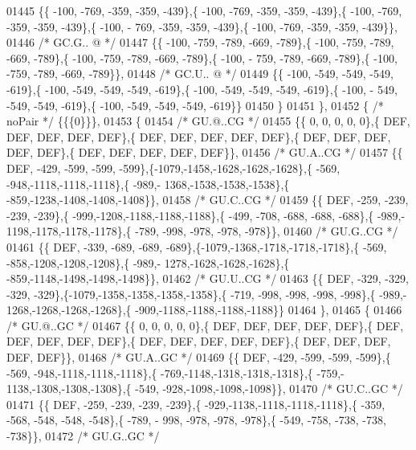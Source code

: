 \begin{DoxyCode}
01445 \{\{ -100, -769, -359, -359, -439\},\{ -100, -769, -359, -359, -439\},\{ -100, -769, -359, -359, -439\},\{ -100, -
      769, -359, -359, -439\},\{ -100, -769, -359, -359, -439\}\},
01446 \textcolor{comment}{/* GC.G.. @ */}
01447 \{\{ -100, -759, -789, -669, -789\},\{ -100, -759, -789, -669, -789\},\{ -100, -759, -789, -669, -789\},\{ -100, -
      759, -789, -669, -789\},\{ -100, -759, -789, -669, -789\}\},
01448 \textcolor{comment}{/* GC.U.. @ */}
01449 \{\{ -100, -549, -549, -549, -619\},\{ -100, -549, -549, -549, -619\},\{ -100, -549, -549, -549, -619\},\{ -100, -
      549, -549, -549, -619\},\{ -100, -549, -549, -549, -619\}\}
01450 \}
01451 \},
01452 \{ \textcolor{comment}{/* noPair */} \{\{\{0\}\}\},
01453 \{
01454 \textcolor{comment}{/* GU.@..CG */}
01455 \{\{    0,    0,    0,    0,    0\},\{  DEF,  DEF,  DEF,  DEF,  DEF\},\{  DEF,  DEF,  DEF,  DEF,  DEF\},\{  DEF,  
      DEF,  DEF,  DEF,  DEF\},\{  DEF,  DEF,  DEF,  DEF,  DEF\}\},
01456 \textcolor{comment}{/* GU.A..CG */}
01457 \{\{  DEF, -429, -599, -599, -599\},\{-1079,-1458,-1628,-1628,-1628\},\{ -569, -948,-1118,-1118,-1118\},\{ -989,-
      1368,-1538,-1538,-1538\},\{ -859,-1238,-1408,-1408,-1408\}\},
01458 \textcolor{comment}{/* GU.C..CG */}
01459 \{\{  DEF, -259, -239, -239, -239\},\{ -999,-1208,-1188,-1188,-1188\},\{ -499, -708, -688, -688, -688\},\{ -989,-
      1198,-1178,-1178,-1178\},\{ -789, -998, -978, -978, -978\}\},
01460 \textcolor{comment}{/* GU.G..CG */}
01461 \{\{  DEF, -339, -689, -689, -689\},\{-1079,-1368,-1718,-1718,-1718\},\{ -569, -858,-1208,-1208,-1208\},\{ -989,-
      1278,-1628,-1628,-1628\},\{ -859,-1148,-1498,-1498,-1498\}\},
01462 \textcolor{comment}{/* GU.U..CG */}
01463 \{\{  DEF, -329, -329, -329, -329\},\{-1079,-1358,-1358,-1358,-1358\},\{ -719, -998, -998, -998, -998\},\{ -989,-
      1268,-1268,-1268,-1268\},\{ -909,-1188,-1188,-1188,-1188\}\}
01464 \},
01465 \{
01466 \textcolor{comment}{/* GU.@..GC */}
01467 \{\{    0,    0,    0,    0,    0\},\{  DEF,  DEF,  DEF,  DEF,  DEF\},\{  DEF,  DEF,  DEF,  DEF,  DEF\},\{  DEF,  
      DEF,  DEF,  DEF,  DEF\},\{  DEF,  DEF,  DEF,  DEF,  DEF\}\},
01468 \textcolor{comment}{/* GU.A..GC */}
01469 \{\{  DEF, -429, -599, -599, -599\},\{ -569, -948,-1118,-1118,-1118\},\{ -769,-1148,-1318,-1318,-1318\},\{ -759,-
      1138,-1308,-1308,-1308\},\{ -549, -928,-1098,-1098,-1098\}\},
01470 \textcolor{comment}{/* GU.C..GC */}
01471 \{\{  DEF, -259, -239, -239, -239\},\{ -929,-1138,-1118,-1118,-1118\},\{ -359, -568, -548, -548, -548\},\{ -789, -
      998, -978, -978, -978\},\{ -549, -758, -738, -738, -738\}\},
01472 \textcolor{comment}{/* GU.G..GC */}

\end{DoxyCode}
